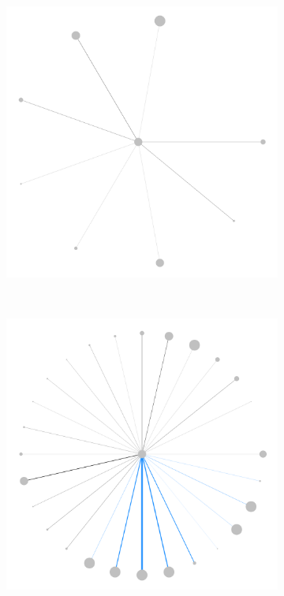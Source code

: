 \documentclass[varwidth, border=0pt]{standalone}
\begin{document}
	\vspace*{-20pt}\begin{figure}
		\centering
		\vspace*{-3pt}\caption*{\textbf{\sffamily(b)}\quad Responsibility}
	\vspace*{-2pt}\begin{subfigure}{0.24\linewidth}
		\centering
		\includegraphics[width=\linewidth]{../../graphics/evolution/responsibility-us-dodd-frank-2010.pdf}%
		\vspace*{3pt}
	\end{subfigure}~%
	\begin{subfigure}{0.24\linewidth}
		\centering
		\includegraphics[width=\linewidth]{../../graphics/evolution/responsibility-us-dodd-frank-2013.pdf}%

\end{subfigure}
\end{figure}
\end{document}
